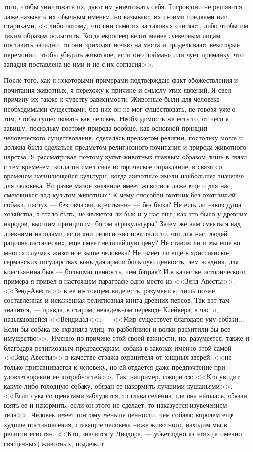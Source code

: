 \documentclass[12pt]{article}
\begin{document}
того, чтобы уничтожать их, дают им уничтожать себя. Тигров они не решаются даже называть их обычным именем, но называют их своими предками или стариками, <<либо потому, что они сами их за таковых считают, либо чтобы им таким образом польстить. Когда европеец велит менее суеверным лицам поставить западни, то они приходят ночью на места и проделывают некоторые церемонии, чтобы убедить животное, если оно поймано или чует приманку, что западня поставлена не ими и не с их согласия>>. 

После того, как я некоторыми примерами подтверждаю факт обожествления и почитания животных, я перехожу к причине и смыслу этих явлений. Я свел причину их также к чувству зависимости. Животные были для человека необходимыми существами; без них он не мог существовать, не говоря уже о том, чтобы существовать как человек. Необходимость же есть то, от чего я завишу; поскольку поэтому природа вообще, как основной принцип человеческого существования, сделалась предметом религии, постольку могла и должна была сделаться предметом религиозного почитания и природа животного царства. Я рассматривал поэтому культ животных главным образом лишь в связи с тем временем, когда он имел свое историческое оправдание, в связи со временем начинающейся культуры, когда животные имели наибольшее значение для человека. Но разве малое значение имеет животное даже еще и для нас, смеющихся над культом животных? К чему способен охотник без охотничьей собаки, пастух --- без овчарки, крестьянин --- без быка? Не есть ли навоз душа хозяйства, а стало быть, не является ли бык и у нас еще, как это было у древних народов, высшим принципом, богом агрикультуры? Зачем же нам смеяться над древними народами, если они религиозно почитали то, что для нас, людей рационалистических, еще имеет величайшую цену? Не ставим ли и мы еще во многих случаях животное выше человека? Не имеет ли еще в христианско-германских государствах конь для армии большую ценность, чем всадник, для крестьянина бык --- большую ценность, чем батрак? И в качестве исторического примера я привел в настоящем параграфе одно место из <<Зенд-Авесты>>. <<Зенд-Авеста>> в ее настоящем виде есть, разумеется, лишь позже составленная и искаженная религиозная книга древних персов. Так вот там значится, --- правда, в старом, ненадежном переводе Клейкера, в части, называющейся <<Вендидад<<: --- <<Мир существует благодаря уму собаки... Если бы собака не охраняла улиц, то разбойники и волки расхитили бы все имущество>>. Именно по причине этой своей важности, но, разумеется, также и благодаря религиозным предрассудкам, собака в законах именно этой самой <<Зенд-Авесты>>  в качестве стража-охранителя от хищных зверей, <<не только приравнивается к человеку, но ей отдается даже предпочтение при удовлетворении ее потребностей>>. Так, например, говорится: <<Кто увидит какую-либо голодную собаку, обязан ее накормить лучшими кушаньями>>. <<Если сука со щенятами заблудится, то глава селения, где она нашлась, обязан взять ее и накормить; если он этого не сделает, то наказуется изувечением тела>>. Человек имеет поэтому меньше ценности, чем собака; впрочем еще худшие постановления, ставящие человека ниже животного, находим мы в религии египтян. <<Кто, значится у Диодора, --- убьет одно из этих (а именно священных) животных, подлежит 
\end{document}
